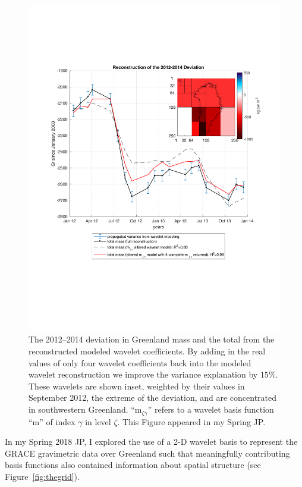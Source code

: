 \documentclass[11pt]{report}
\begin{document}
\begin{figure} 
\vspace{-50pt}
\includegraphics[width=\linewidth]{Figures/deviant.pdf}
\caption[Location of the 2012--2014 Deviation]{The 2012--2014 deviation in Greenland mass and the total from the reconstructed modeled wavelet coefficients. By adding in the real values of only four wavelet coefficients back into the modeled wavelet reconstruction we improve the variance explanation by $15\%$. These wavelets are shown inset, weighted by their values in September 2012, the extreme of the deviation, and are concentrated in southwestern Greenland. ``m$_{\zeta\gamma}$'' refers to a wavelet basis function ``m'' of index $\gamma$ in level $\zeta$. This Figure appeared in my Spring JP.
\label{fig:deviant}}
\end{figure}

In my Spring 2018 JP, I explored the use of a 2-D wavelet basis to represent the GRACE gravimetric data over Greenland such that meaningfully contributing basis functions also contained information about spatial structure (see
Figure~\ref{fig:thegrid}). 
\end{document}
